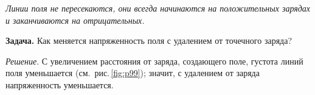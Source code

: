 \documentclass[main.tex]{subfiles}
\begin{document}
\emph{Линии поля не пересекаются, они всегда начинаются на положительных зарядах и заканчиваются на отрицательных.}

\medskip

\noindent\textbf{Задача.} Как меняется напряженность поля с удалением от точечного заряда?

\smallskip

\noindent\emph{Решение}. С увеличением расстояния от заряда, создающего поле, густота линий поля уменьшается (см.~рис.\,\ref{fig:p99}); значит, с удалением от заряда напряженность уменьшается.




 
\end{document}
